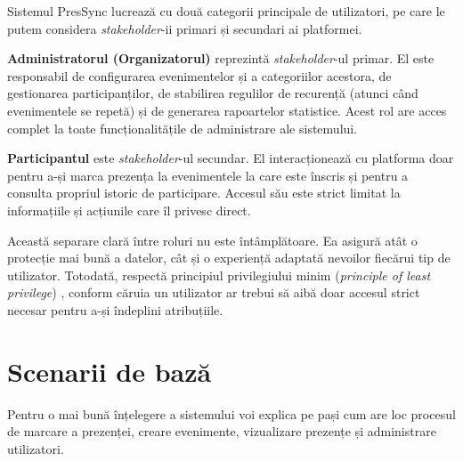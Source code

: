 \documentclass[a4paper,12pt,oneside]{report}
\begin{document}
    Sistemul PresSync lucrează cu două categorii principale de utilizatori, pe care le putem considera \textit{stakeholder}-ii primari și secundari ai platformei.

\textbf{Administratorul (Organizatorul)} reprezintă \textit{stakeholder}-ul primar. El este responsabil de configurarea evenimentelor și a categoriilor acestora, de gestionarea participanților, de stabilirea regulilor de recurență (atunci când evenimentele se repetă) și de generarea rapoartelor statistice. Acest rol are acces complet la toate funcționalitățile de administrare ale sistemului.

\textbf{Participantul} este \textit{stakeholder}-ul secundar. El interacționează cu platforma doar pentru a-și marca prezența la evenimentele la care este înscris și pentru a consulta propriul istoric de participare. Accesul său este strict limitat la informațiile și acțiunile care îl privesc direct.

Această separare clară între roluri nu este întâmplătoare. Ea asigură atât o protecție mai bună a datelor, cât și o experiență adaptată nevoilor fiecărui tip de utilizator. Totodată, respectă principiul privilegiului minim (\textit{principle of least privilege}) \cite{puchianu_iss}, conform căruia un utilizator ar trebui să aibă doar accesul strict necesar pentru a-și îndeplini atribuțiile.
\section{Scenarii de bază}

Pentru o mai bună înțelegere a sistemului voi explica pe pași cum are loc procesul de marcare a prezenței, creare evenimente, vizualizare prezențe și administrare utilizatori.
\end{document}
